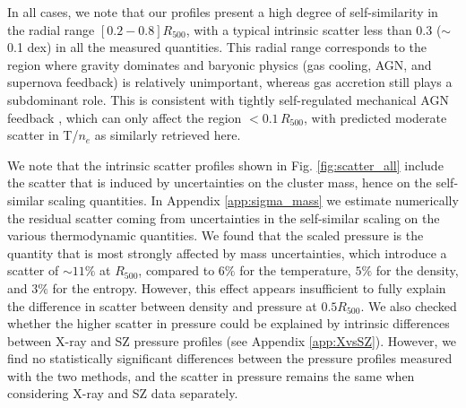 \documentclass[traditabstract   ]{aa} %
\begin{document}
In all cases, we note that our profiles present a high degree of self-similarity in the radial range $[0.2-0.8]R_{500}$, with a typical intrinsic scatter less than 0.3 ($\sim$ 0.1 dex) in all the measured quantities. This radial range corresponds to the region where gravity dominates and baryonic physics (gas cooling, AGN, and supernova feedback) is relatively unimportant, whereas gas accretion still plays a subdominant role. 
This is consistent with tightly self-regulated mechanical AGN feedback \citep[e.g., via chaotic cold accretion][]{gaspari12}, which can only affect the region $< 0.1\,R_{500}$, with predicted moderate scatter in T/$n_e$ as similarly retrieved here.

We note that the intrinsic scatter profiles shown in Fig. \ref{fig:scatter_all} include the scatter that is induced by uncertainties on the cluster mass, hence on the self-similar scaling quantities. In Appendix \ref{app:sigma_mass} we estimate numerically the residual scatter coming from uncertainties in the self-similar scaling on the various thermodynamic quantities. We found that the scaled pressure is the quantity that is most strongly affected by mass uncertainties, which introduce a scatter of $\sim11\%$ at $R_{500}$, compared to $6\%$ for the temperature, $5\%$ for the density, and $3\%$ for the entropy. However, this effect appears insufficient to fully explain the difference in scatter between  density and pressure at $0.5R_{500}$. We also checked whether the higher scatter in pressure could be explained by intrinsic differences between X-ray and SZ pressure profiles (see Appendix \ref{app:XvsSZ}). However, we find no statistically significant differences between the pressure profiles measured with the two methods, and the scatter in pressure remains the same when considering X-ray and SZ data separately. 
\end{document}
